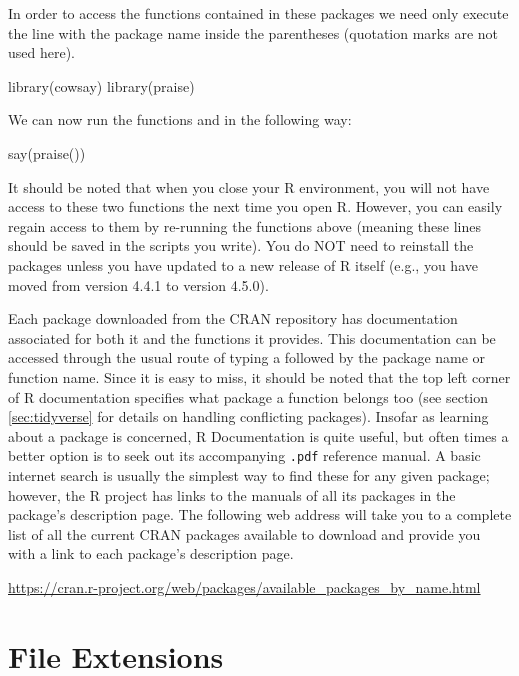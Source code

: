 In order to access the functions contained in these packages we need only execute the line  with the package name inside the parentheses (quotation marks are not used here).

\begin{inR}
library(cowsay)
library(praise)
\end{inR}
\medskip

\noindent
We can now run the functions  and  in the following way: 

\begin{inR}
say(praise())
\end{inR}
\medskip

It should be noted that when you close your R environment, you will not have access to these two functions the next time you open R.  However, you can easily regain access to them by re-running the  functions above (meaning these lines should be saved in the scripts you write).  You do NOT need to reinstall the packages unless you have updated to a new release of R itself (e.g., you have moved from version 4.4.1 to version 4.5.0).

Each package downloaded from the CRAN repository has documentation associated for both it and the functions it provides.  This documentation can be accessed through the usual route of typing a  followed by the package name or function name.  Since it is easy to miss, it should be noted that the top left corner of R documentation specifies what package a function belongs too (see section \ref{sec:tidyverse} for details on handling conflicting packages). Insofar as learning about a package is concerned, R Documentation is quite useful, but often times a better option is to seek out its accompanying \texttt{.pdf} reference manual.  A basic internet search is usually the simplest way to find these for any given package; however, the R project has links to the manuals of all its packages in the package's description page. The following web address will take you to a complete list of all the current CRAN packages available to download and provide you with a link to each package's description page.

\begin{center}
\url{https://cran.r-project.org/web/packages/available_packages_by_name.html}
\end{center}

\section{File Extensions}

